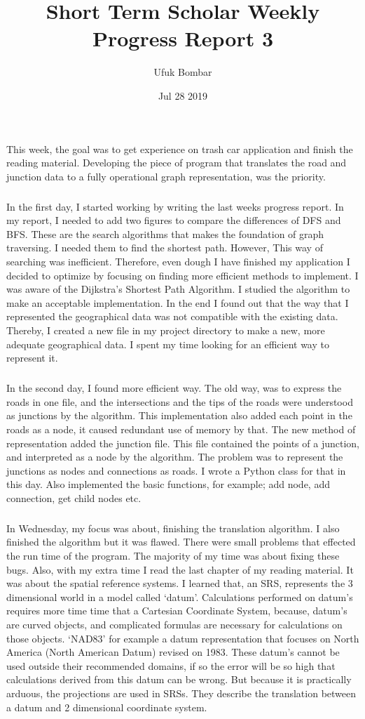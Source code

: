 \documentclass{article}
\title{Short Term Scholar Weekly Progress Report 3}
\author{Ufuk Bombar}
\date{Jul 28 2019}
\begin{document}
\maketitle

\subparagraph{}
This week, the goal was to get experience on trash car application and finish the reading material. Developing the piece of program that translates the road and junction data to a fully operational graph representation, was the priority.

\subparagraph{}
In the first day, I started working by writing the last weeks progress report. In my report, I needed to add two figures to compare the differences of DFS and BFS. These are the search algorithms that makes the foundation of graph traversing. I needed them to find the shortest path. However, This way of searching was inefficient. Therefore, even dough I have finished my application I decided to optimize by focusing on finding more efficient methods to implement. I was aware of the Dijkstra's Shortest Path Algorithm\cite{shortestpath}. I studied the algorithm to make an acceptable implementation. In the end I found out that the way that I represented the geographical data was not compatible with the existing data. Thereby, I created a new file in my project directory to make a new, more adequate geographical data. I spent my time looking for an efficient way to represent it.

\subparagraph{}
In the second day, I found more efficient way. The old way, was to express the roads in one file, and the intersections and the tips of the roads were understood as junctions by the algorithm. This implementation also added each point in the roads as a node, it caused redundant use of memory by that. The new method of representation added the junction file. This file contained the points of a junction, and interpreted as a node by the algorithm. The problem was to represent the junctions as nodes and connections as roads. I wrote a Python class for that in this day. Also implemented the basic functions, for example; add node, add connection, get child nodes etc.
    
\subparagraph{}
In Wednesday, my focus was about, finishing the translation algorithm. I also finished the algorithm but it was flawed. There were small problems that effected the run time of the program. The majority of my time was about fixing these bugs. Also, with my extra time I read the last chapter of my reading material. It was about the spatial reference systems. I learned that, an SRS, represents the 3 dimensional world in a model called ‘datum’. Calculations performed on datum's requires more time time that a Cartesian Coordinate System, because, datum's are curved objects, and complicated formulas are necessary for calculations on those objects. ‘NAD83’ for example a datum representation that focuses on North America (North American Datum) revised on 1983\cite{nad83}. These datum’s cannot be used outside their recommended domains, if so the error will be so high that calculations derived from this datum can be wrong. But because it is practically arduous, the projections are used in SRSs. They describe the translation between a datum and 2 dimensional coordinate system.
    
\end{document}
